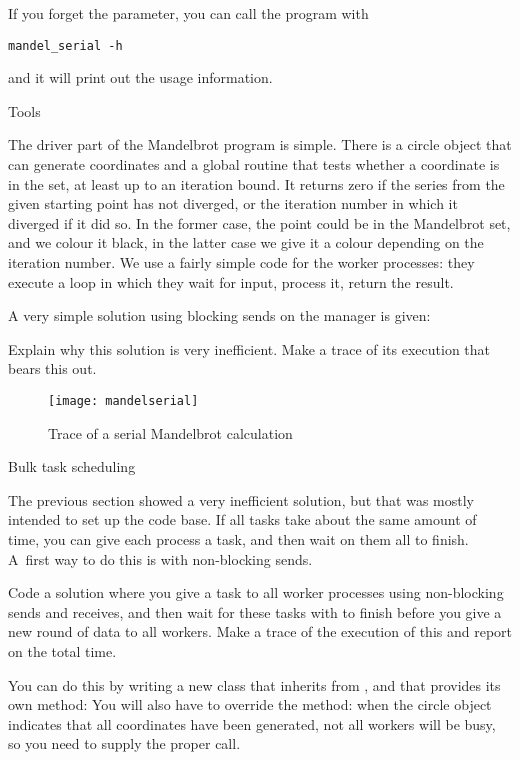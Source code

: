 If you forget the parameter, you can call the program with
\begin{verbatim}
mandel_serial -h
\end{verbatim}
and it will print out the usage information.

 {Tools}

The driver part of the Mandelbrot program is simple. There is a 
circle object that can generate coordinates
and a global routine that tests whether a coordinate is in the set,
at least up to an iteration bound. It returns zero if the 
series from the given starting point has not diverged,
or the iteration number in which it diverged if it did so.
In the former case,  the point could be in the Mandelbrot set, 
and we colour it black, in the latter case we give it a colour
depending on the iteration number.
We use a fairly simple code for the worker processes: they 
execute a loop in which they wait 
for input, process it, return the result.

A very simple solution using blocking sends on the manager is given:

\begin{exercise}
  Explain why this solution is very inefficient. Make a trace of its
  execution that bears this out.
\end{exercise}

\begin{figure}[ht]
\texttt{[image: mandelserial]}
\caption{Trace of a serial Mandelbrot calculation}
\label{fig:mandel-serial}
\end{figure}

 {Bulk task scheduling}
\label{proj:mandel-bulk}

The previous section showed a very inefficient solution, but that was mostly
intended to set up the code base. If all tasks take about the same amount of time,
you can give each process a task, and then wait on them all to finish. A~first way
to do this is with non-blocking sends.

\begin{exercise}
  Code a  solution where you give a task to all worker processes
  using non-blocking sends and receives, and then wait for these tasks
  with 
  to finish before you give a new round of data to all workers.
  Make a trace of the execution of this and report on the total time.

  You can do this by writing a new class that inherits from ,
  and that provides its own  method:
  You will also have to override the  method: when the circle 
  object indicates that all coordinates have been generated, not all
  workers will be busy, so you need to supply the proper 
  call.
\end{exercise}

